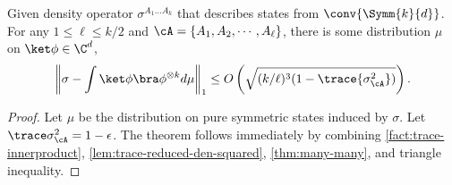 \begin{theorem}\label{thm:conv-symm-de-Finetti}
Given density operator $\sigma^{A_1\ldots A_k}$ that describes states from $\conv{\Symm{k}{d}}$. 
For any $1\le \ell\le k/2$ and $\cA=\{A_1,A_2,\cdots, A_\ell\}$, there is some distribution $\mu$ on $\ket\phi\in\C^d$,
\begin{align}
    \left\|
        \sigma - \int \ket\phi\bra\phi^{\otimes k} d\mu
    \right\|_1 \le O\left(\sqrt{(k/\ell)^3(1-\trace{\sigma_{\cA}^2}) }\right).
\end{align}

\end{theorem}
\begin{proof}
Let $\mu$ be the distribution on pure symmetric states induced by $\sigma$. Let $\trace\sigma_{\cA}^2=1-\epsilon$. The theorem follows immediately by combining \cref{fact:trace-innerproduct}, \cref{lem:trace-reduced-den-squared}, \cref{thm:many-many}, and triangle inequality.
\end{proof}
